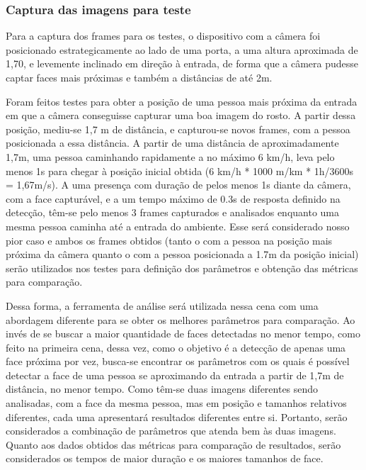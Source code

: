 \subsubsection{Captura das imagens para teste}

Para a captura dos frames para os testes, o dispositivo com a câmera foi posicionado estrategicamente ao lado de uma porta, a uma altura aproximada de 1,70, e levemente inclinado em direção à entrada, de forma que a câmera pudesse captar faces mais próximas e também a distâncias de até 2m.

Foram feitos testes para obter a posição de uma pessoa mais próxima da entrada em que a câmera conseguisse capturar uma boa imagem do rosto. A partir dessa posição, mediu-se 1,7 m de distância, e capturou-se novos frames, com a pessoa posicionada a essa distância. A partir de uma distância de aproximadamente 1,7m, uma pessoa caminhando rapidamente a no máximo 6 km/h, leva pelo menos 1s para chegar à posição inicial obtida (6 km/h * 1000 m/km * 1h/3600s = 1,67m/s). A uma presença com duração de pelos menos 1s diante da câmera, com a face capturável, e a um tempo máximo de 0.3s de resposta definido na detecção, têm-se pelo menos 3 frames capturados e analisados enquanto uma mesma pessoa caminha até a entrada do ambiente. Esse será considerado nosso pior caso e ambos os frames obtidos (tanto o com a pessoa na posição mais próxima da câmera quanto o com a pessoa posicionada a 1.7m da posição inicial) serão utilizados nos testes para definição dos parâmetros e obtenção das métricas para comparação. \label{sssec:memoria_calculo}

Dessa forma, a ferramenta de análise será utilizada nessa cena com uma abordagem diferente para se obter os melhores parâmetros para comparação. Ao invés de se buscar a maior quantidade de faces detectadas no menor tempo, como feito na primeira cena, dessa vez, como o objetivo é a detecção de apenas uma face próxima por vez, busca-se encontrar os parâmetros com os quais é possível detectar a face de uma pessoa se aproximando da entrada a partir de 1,7m de distância, no menor tempo. Como têm-se duas imagens diferentes sendo analisadas, com a face da mesma pessoa, mas em posição e tamanhos relativos diferentes, cada uma apresentará resultados diferentes entre si. Portanto, serão considerados a combinação de parâmetros que atenda bem às duas imagens. Quanto aos dados obtidos das métricas para comparação de resultados, serão considerados os tempos de maior duração e os maiores tamanhos de face.

